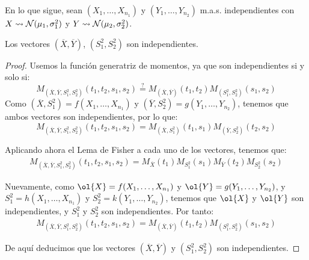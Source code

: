 En lo que sigue, sean $(X_1, \ldots, X_{n_1})$ y $(Y_1, \ldots, Y_{n_2})$ m.a.s. independientes con $X\rightsquigarrow \mathcal{N}(\mu_1, \sigma_1^2)$ y $Y\rightsquigarrow \mathcal{N}(\mu_2, \sigma_2^2)$.
\begin{teo}
    Los vectores $(\overline{X},\overline{Y})$, $(S_1^2, S_2^2)$ son independientes.
    \begin{proof}
        Usemos la función generatriz de momentos, ya que son independientes si y solo si:
        \begin{equation*}
            M_{\left(\overline{X},\overline{Y},S_1^2, S_2^2\right)}(t_1,t_2,s_1,s_2) \stackrel{\text{?}}{=} M_{\left(\overline{X},\overline{Y}\right)}(t_1,t_2) M_{\left(S_1^2,S_2^2\right)}(s_1,s_2)
        \end{equation*}
        Como $\left(\overline{X},S_1^2\right)= f(X_1, \ldots, X_{n_1})$ y $\left(\overline{Y},S_2^2\right)=g(Y_1, \ldots, Y_{n_2})$, tenemos que ambos vectores son independientes, por lo que:
        \begin{equation*}
            M_{\left(\overline{X},\overline{Y},S_1^2, S_2^2\right)}(t_1,t_2,s_1,s_2) = M_{\left(\overline{X},S_1^2\right)}(t_1,s_1) M_{(\overline{Y},S_2^2)}(t_2,s_2)
        \end{equation*}

        Aplicando ahora el Lema de Fisher a cada uno de los vectores, tenemos que:
        \begin{align*}
            M_{\left(\overline{X},\overline{Y},S_1^2, S_2^2\right)}(t_1,t_2,s_1,s_2) = M_{\overline{X}}(t_1) M_{S_1^2}(s_1) M_{\overline{Y}}(t_2) M_{S_2^2}(s_2)
        \end{align*}

        Nuevamente, como $\ol{X}= f(X_1, \ldots, X_{n_1})$ y $\ol{Y}=g(Y_1, \ldots, Y_{n_2})$, y $S_1^2 = h(X_1, \ldots, X_{n_1})$ y $S_2^2 = k(Y_1, \ldots, Y_{n_2})$, tenemos que $\ol{X}$ y $\ol{Y}$ son independientes, y $S_1^2$ y $S_2^2$ son independientes. Por tanto:
        \begin{align*}
            M_{\left(\overline{X},\overline{Y},S_1^2, S_2^2\right)}(t_1,t_2,s_1,s_2) = M_{\left(\overline{X},\overline{Y}\right)}(t_1,t_2) M_{\left(S_1^2,S_2^2\right)}(s_1,s_2)
        \end{align*}
        
        De aquí deducimos que los vectores $(\overline{X},\overline{Y})$ y $(S_1^2, S_2^2)$ son independientes.
    \end{proof}
\end{teo}

